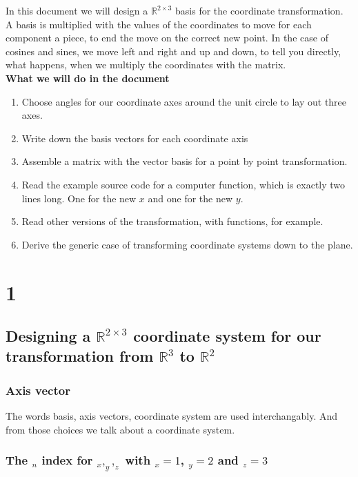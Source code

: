 \documentclass[a4paper]{article}
\begin{document}
In this document we will design a $\mathbb{R}^{2\times{3}}$ basis for the coordinate transformation. 
A basis is multiplied with the values of the coordinates to move for each component 
a piece, to end the move on the correct new point.
In the case of cosines and sines, we move left and right and up and down, to 
tell you directly, what happens, when we multiply the coordinates with the matrix.\\

\textbf{What we will do in the document}

\begin{enumerate}
\item Choose angles for our coordinate axes around the unit circle to lay out three axes.
\item Write down the basis vectors for each coordinate axis
\item Assemble a matrix with the vector basis for a point by point transformation.
\item Read the example source code for a computer function, which is exactly two lines long. One for the new $x$ and one for the new $y$.
\item Read other versions of the transformation, with functions, for example.
\item Derive the generic case of transforming coordinate systems down to the plane.

\end{enumerate}

\chapter{1}

\section{Designing a $\mathbb{R}^{2\times{3}}$ coordinate system for our transformation from $\mathbb{R}^{3}$ to $\mathbb{R}^{2}$}

\subsection{Axis vector}

The words basis, axis vectors, coordinate system are used interchangably. And from those choices we talk about a coordinate system.

\subsection{The $_{n}$ index for $_x,_y,_z$ with $_x=1$, $_y=2$ and $_z=3$}
\end{document}
